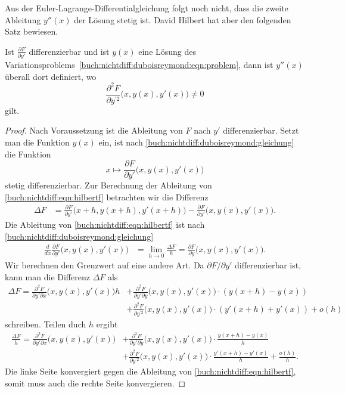 Aus der Euler-Lagrange-Differentialgleichung folgt noch nicht, dass
die zweite Ableitung $y''(x)$ der Lösung stetig ist.
David Hilbert hat aber den folgenden Satz bewiesen.

\begin{satz}
Ist $\frac{\partial F}{\partial y'}$ differenzierbar und ist $y(x)$ eine
Lösung des Variationsproblems~\eqref{buch:nichtdiff:duboisreymond:eqn:problem},
dann ist $y''(x)$ überall dort definiert, wo
\begin{equation}
\frac{\partial^2 F}{\partial y^{\prime 2}}\bigl(x,y(x),y'(x)\bigr) \ne 0
\label{buch:nichtdiff:duboysreymond:eqn:positiv}
\end{equation}
gilt.
\end{satz}

\begin{proof}
Nach Voraussetzung ist die Ableitung von $F$ nach $y'$ differenzierbar.
Setzt man die Funktion $y(x)$ ein, ist nach 
\eqref{buch:nichtdiff:duboisreymond:gleichung}
die Funktion
\begin{equation}
x\mapsto
\frac{\partial F}{\partial y'}\bigl(x,y(x),y'(x)\bigr)
\label{buch:nichtdiff:eqn:hilbertf}
\end{equation}
stetig differenzierbar.
Zur Berechnung der Ableitung von \eqref{buch:nichtdiff:eqn:hilbertf}
betrachten wir die Differenz
\begin{align*}
\Delta F
&=
\frac{\partial F}{\partial y'}\bigl(x+h,y(x+h),y'(x+h)\bigr)
-
\frac{\partial F}{\partial y'}\bigl(x,y(x),y'(x)\bigr).
\end{align*}
Die Ableitung von \eqref{buch:nichtdiff:eqn:hilbertf} ist
nach \eqref{buch:nichtdiff:duboisreymond:gleichung}
\begin{align*}
\frac{d}{dx}
\frac{\partial F}{\partial y'}\bigl(x,y(x),y'(x)\bigr)
&=
\lim_{h\to 0}
\frac{\Delta F}{h}
=
\frac{\partial F}{\partial y}\bigl(x,y(x),y'(x)\bigr).
\end{align*}
Wir berechnen den Grenzwert auf eine andere Art.
Da $\partial F/\partial y'$ differenzierbar ist, kann man die Differenz
$\Delta F$ als
\begin{align*}
\Delta F
=
\frac{\partial^2 F}{\partial y'\partial x}\bigl(x,y(x),y'(x)\bigr) h
&+
\frac{\partial^2 F}{\partial y'\partial y}\bigl(x,y(x),y'(x)\bigr)
\cdot
(y(x+h)-y(x))
\\
&+
\frac{\partial^2 F}{\partial y^{\prime 2}}\bigl(x,y(x),y'(x)\bigr)
\cdot
(y'(x+h)+y'(x))
+
o(h)
\end{align*}
schreiben.
Teilen duch $h$ ergibt
\begin{align}
\frac{\Delta F}{h}
=
\frac{\partial^2 F}{\partial y'\partial x}\bigl(x,y(x),y'(x)\bigr)
&+
\frac{\partial^2 F}{\partial y'\partial y}\bigl(x,y(x),y'(x)\bigr)
\cdot
\frac{y(x+h)-y(x)}{h}
\label{buch:nichtdiff:eqn:hilbertlim1}
\\
&+
\frac{\partial^2 F}{\partial y^{\prime 2}}\bigl(x,y(x),y'(x)\bigr)
\cdot
\frac{y'(x+h)-y'(x)}{h}
+
\frac{o(h)}{h}.
\label{buch:nichtdiff:eqn:hilbertlim2}
\end{align}
Die linke Seite konvergiert gegen die Ableitung von
\eqref{buch:nichtdiff:eqn:hilbertf}, somit muss auch die rechte Seite
konvergieren.


\end{proof}
